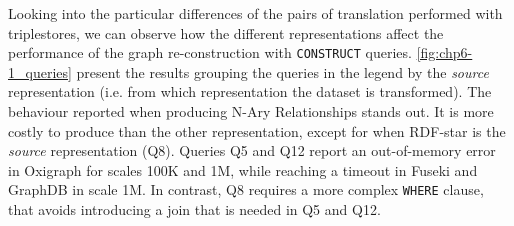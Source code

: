 Looking into the particular differences of the pairs of translation performed with triplestores, we can observe how the different representations affect the performance of the graph re-construction with \texttt{CONSTRUCT} queries. \cref{fig:chp6-1_queries} present the results grouping the queries in the legend by the \textit{source} representation (i.e. from which representation the dataset is transformed). 
The behaviour reported when producing N-Ary Relationships stands out. It is more costly to produce than the other representation, except for when RDF-star is the \textit{source} representation (Q8). Queries Q5 and Q12 report an out-of-memory error in Oxigraph for scales 100K and 1M, while reaching a timeout in Fuseki and GraphDB in scale 1M. In contrast, Q8 requires a more complex \texttt{WHERE} clause, that avoids introducing a join that is needed in Q5 and Q12. 


